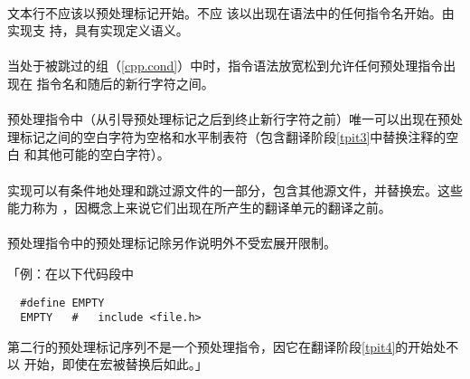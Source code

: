 \paragraph{}
文本行不应该以\tm{\#}预处理标记开始。不应
该以出现在语法中的任何指令名开始。由实现支
持，具有实现定义语义。

\paragraph{}
当处于被跳过的组（\ref{cpp.cond}）中时，指令语法放宽松到允许任何预处理指令出现在
指令名和随后的新行字符之间。

\paragraph{}
预处理指令中（从引导预处理标记\tm{\#}之后到终止新行字符之前）唯一可以出现在预处
理标记之间的空白字符为空格和水平制表符（包含翻译阶段\ref{tpit3}中替换注释的空白
和其他可能的空白字符）。

\paragraph{}
实现可以有条件地处理和跳过源文件的一部分，包含其他源文件，并替换宏。这些能力称为
，因概念上来说它们出现在所产生的翻译单元的翻译之前。

\paragraph{}
预处理指令中的预处理标记除另作说明外不受宏展开限制。

「例：在以下代码段中
\begin{lstlisting}
  #define EMPTY
  EMPTY   #   include <file.h>
\end{lstlisting}
第二行的预处理标记序列不是一个预处理指令，因它在翻译阶段\ref{tpit4}的开始处不以
\tm{\#}开始，即使在宏被替换后如此。」


